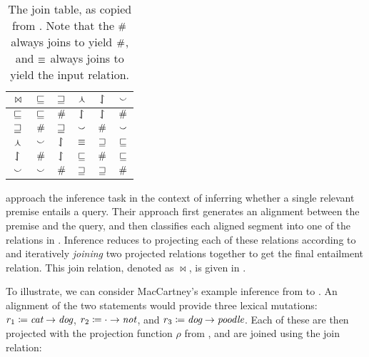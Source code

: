 %
%

\begin{table}[t]
	\begin{center}
	\begin{tabular}{|c||c|c|c|c|c|}
    \hline
    $\bowtie$ & $\sqsubseteq$ & $\sqsupseteq$ & $\curlywedge$ & $\downharpoonleft\hspace{-1.25mm}\upharpoonright$ & $\smallsmile$ \\
    \hline
    $\sqsubseteq$ & $\sqsubseteq$ & $\#$ & $\downharpoonleft\hspace{-1.25mm}\upharpoonright$ & $\downharpoonleft\hspace{-1.25mm}\upharpoonright$ & $\#$ \\
    $\sqsupseteq$ & $\#$ & $\sqsupseteq$ & $\smallsmile$ & $\#$ & $\smallsmile$ \\
    $\curlywedge$ & $\smallsmile$ & $\downharpoonleft\hspace{-1.25mm}\upharpoonright$ & $\equiv$ & $\sqsupseteq$ & $\sqsubseteq$ \\
    $\downharpoonleft\hspace{-1.25mm}\upharpoonright$ & $\#$ & $\downharpoonleft\hspace{-1.25mm}\upharpoonright$ & $\sqsubseteq$ & $\#$ & $\sqsubseteq$ \\
    $\smallsmile$ & $\smallsmile$ & $\#$ & $\sqsupseteq$ & $\sqsupseteq$ & $\#$ \\
    \hline
	\end{tabular}
	\caption{
    The join table, as copied from .
    Note that the $\#$ always joins to yield $\#$,
    and $\equiv$ always joins to yield the input relation.
		\label{tab:join}
	}
	\end{center}
\end{table}

 approach the inference task in
  the context of inferring whether a single relevant premise entails
  a query.
Their approach first generates an alignment between the premise
  and the query, and then classifies each aligned segment into one of
  the relations in .
Inference reduces to projecting each of these relations
  according to  and iteratively \textit{joining} 
  two projected relations together to get the final entailment
  relation.
This join relation, denoted as $\bowtie$, 
  is given in .

To illustrate, we can consider MacCartney's example inference from
   to .
An alignment of the two statements would provide three lexical
  mutations:
    \mbox{$r_1\coloneqq\textit{cat}\rightarrow\textit{dog}$}, 
    \mbox{$r_2\coloneqq\cdot\rightarrow\textit{not}$},
    and \mbox{$r_3\coloneqq\textit{dog}\rightarrow\textit{poodle}$}.
Each of these are then projected with the projection function $\rho$
  from ,
  and are joined using the join relation:

